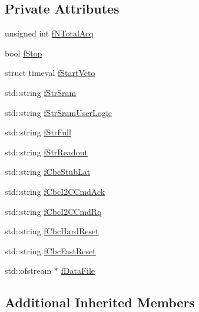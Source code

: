\subsection*{Private Attributes}
\begin{DoxyCompactItemize}
\item 
unsigned int \hyperlink{class_ph2___hw_interface_1_1_glib_interface_a1b8fe11933c22b5c97e23ad2c4e4407c}{f\-N\-Total\-Acq}
\item 
bool \hyperlink{class_ph2___hw_interface_1_1_glib_interface_a0cc29dcdff019e8b11ea8ebab631159e}{f\-Stop}
\item 
struct timeval \hyperlink{class_ph2___hw_interface_1_1_glib_interface_a056c3192477cbd07c67ff822bc7123de}{f\-Start\-Veto}
\item 
std\-::string \hyperlink{class_ph2___hw_interface_1_1_glib_interface_a9e24a95e6ba16076ef8fbea1c96243f4}{f\-Str\-Sram}
\item 
std\-::string \hyperlink{class_ph2___hw_interface_1_1_glib_interface_a27b44db1be7f8a3802ba1a5d675a9888}{f\-Str\-Sram\-User\-Logic}
\item 
std\-::string \hyperlink{class_ph2___hw_interface_1_1_glib_interface_a40299b584632b402f3c54fc9d98d87f2}{f\-Str\-Full}
\item 
std\-::string \hyperlink{class_ph2___hw_interface_1_1_glib_interface_a925d65d022d0dc6d453e0e611826c377}{f\-Str\-Readout}
\item 
std\-::string \hyperlink{class_ph2___hw_interface_1_1_glib_interface_aa72b2c10537eb001fe5bd7ee611b2d57}{f\-Cbc\-Stub\-Lat}
\item 
std\-::string \hyperlink{class_ph2___hw_interface_1_1_glib_interface_ae9ec903a2dd264ad800292d7c3aa3d2b}{f\-Cbc\-I2\-C\-Cmd\-Ack}
\item 
std\-::string \hyperlink{class_ph2___hw_interface_1_1_glib_interface_a413443d88da98de71c5fcfa998ea89b5}{f\-Cbc\-I2\-C\-Cmd\-Rq}
\item 
std\-::string \hyperlink{class_ph2___hw_interface_1_1_glib_interface_a3c87ad019e3df02833d10cf653b4e1eb}{f\-Cbc\-Hard\-Reset}
\item 
std\-::string \hyperlink{class_ph2___hw_interface_1_1_glib_interface_a3f6d3aec340c12329fe26242de9b9577}{f\-Cbc\-Fast\-Reset}
\item 
std\-::ofstream $\ast$ \hyperlink{class_ph2___hw_interface_1_1_glib_interface_a6efc2da55aafca870e1259e78436e1ef}{f\-Data\-File}
\end{DoxyCompactItemize}
\subsection*{Additional Inherited Members}


